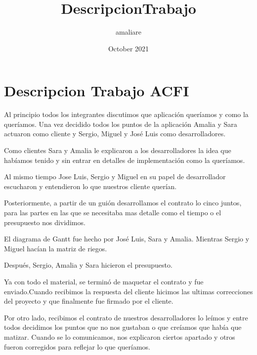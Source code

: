\documentclass{article}
\title{DescripcionTrabajo}
\author{amaliare }
\date{October 2021}
\begin{document}
\section*{Descripcion Trabajo ACFI} 

Al principio todos los integrantes discutimos que aplicación queríamos y como la queríamos. Una vez decidido todos los puntos de la aplicación Amalia y Sara actuaron como cliente y Sergio, Miguel y José Luis como desarrolladores. 

Como clientes Sara y Amalia le explicaron a los desarrolladores la idea que habíamos tenido y sin entrar en detalles de implementación como la queríamos.

Al mismo tiempo Jose Luis, Sergio y Miguel en su papel de desarrollador escucharon y entendieron lo que nuestros cliente querían.

Posteriormente, a partir de un guión desarrollamos el contrato lo cinco juntos, para las partes en las que se necesitaba mas detalle como el tiempo o el presupuesto nos dividimos.

El diagrama de Gantt fue hecho por José Luis, Sara y Amalia. Mientras Sergio y Miguel hacían la matriz de riegos.

Después, Sergio, Amalia y Sara hicieron el presupuesto.

Ya con todo el material, se terminó de maquetar el contrato y fue enviado.Cuando recibimos la respuesta del cliente hicimos las ultimas correcciones del proyecto y que finalmente fue firmado por el cliente.

Por otro lado, recibimos el contrato de nuestros desarrolladores lo leímos y entre todos decidimos los puntos que no nos gustaban o que creíamos que había que matizar. Cuando se lo comunicamos, nos explicaron ciertos apartado y otros fueron corregidos para reflejar lo que queríamos.
\end{document}
